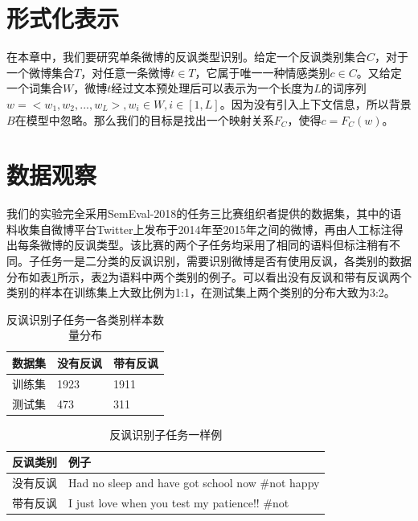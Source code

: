 \section{形式化表示}
\label{sec:exp_irony_det_format}

在本章中，我们要研究单条微博的反讽类型识别。给定一个反讽类别集合$C$，对于一个微博集合$T$，对任意一条微博$t \in T$，它属于唯一一种情感类别$c \in C$。又给定一个词集合$W$，微博$t$经过文本预处理后可以表示为一个长度为$L$的词序列 $w = <w_1, w_2, ..., w_L>, w_i \in W, i \in [1, L]$。因为没有引入上下文信息，所以背景$B$在模型中忽略。那么我们的目标是找出一个映射关系$F_C$，使得$c=F_C(w)$。

\section{数据观察}
\label{sec:exp_irony_det_data}

我们的实验完全采用SemEval-2018的任务三比赛组织者提供的数据集，其中的语料收集自微博平台Twitter上发布于2014年至2015年之间的微博，再由人工标注得出每条微博的反讽类型。该比赛的两个子任务均采用了相同的语料但标注稍有不同。子任务一是二分类的反讽识别，需要识别微博是否有使用反讽，各类别的数据分布如表\ref{tab:semeval_2018_task3_A_data}所示，表\ref{tab:semeval_2018_task3_A_sample}为语料中两个类别的例子。可以看出没有反讽和带有反讽两个类别的样本在训练集上大致比例为1:1，在测试集上两个类别的分布大致为3:2。

\begin{table}[htb]
  \centering
  \begin{minipage}[t]{0.7\linewidth} %
  \caption{反讽识别子任务一各类别样本数量分布}
  \label{tab:semeval_2018_task3_A_data}
    \begin{tabularx}{\linewidth}{X|XX}
    \toprule[1.5pt]
    数据集 & 没有反讽 & 带有反讽 \\  
    \hline
    训练集 & 1923 & 1911 \\
    测试集 & 473  & 311 \\
    \bottomrule[1.5pt]
    \end{tabularx}
  \end{minipage}
\end{table}

\begin{table}[htb]
  \centering
  \begin{minipage}[t]{0.8\linewidth} %
  \caption{反讽识别子任务一样例}
  \label{tab:semeval_2018_task3_A_sample}
  \begin{tabularx}{\linewidth}{l|X}
    \toprule[1.5pt]
    反讽类别 & 例子 \\
    \hline
    没有反讽 & Had no sleep and have got school now \#not happy \\
    带有反讽 & I just love when you test my patience!! \#not \\
    \bottomrule[1.5pt]
  \end{tabularx}
  \end{minipage}
\end{table}


